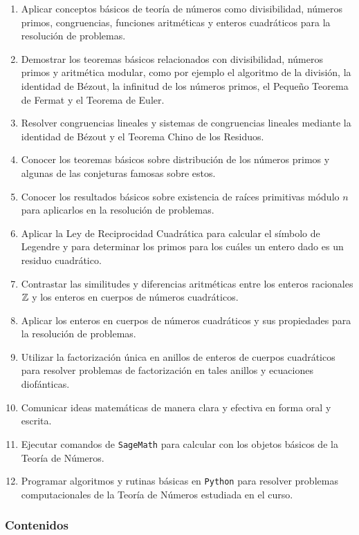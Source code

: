 \begin{refsection}
\begin{enumerate}
\item Aplicar conceptos básicos de teoría de números como divisibilidad, números primos, congruencias, funciones aritméticas y enteros cuadráticos para la resolución de problemas.
\item Demostrar los teoremas básicos relacionados con divisibilidad, números primos y aritmética modular, como por ejemplo el algoritmo de la división, la identidad de Bézout, la infinitud de los números primos, el Pequeño Teorema de Fermat y el Teorema de Euler.
\item Resolver congruencias lineales y sistemas de congruencias lineales mediante la identidad de Bézout y el Teorema Chino de los Residuos.
\item Conocer los teoremas básicos sobre distribución de los números primos y algunas de las conjeturas famosas sobre estos.
\item Conocer los resultados básicos sobre existencia de raíces primitivas módulo $n$ para aplicarlos en la resolución de problemas.
\item Aplicar la Ley de Reciprocidad Cuadrática para calcular el símbolo de Legendre y para determinar los primos para los cuáles un entero dado es un residuo cuadrático.
\item Contrastar las similitudes y diferencias aritméticas entre los enteros racionales $\mathbb{Z}$ y los enteros en cuerpos de números cuadráticos.
\item Aplicar los enteros en cuerpos de números cuadráticos y sus propiedades para la resolución de problemas.
\item Utilizar la factorización única en anillos de enteros de cuerpos cuadráticos para resolver problemas de factorización en tales anillos y ecuaciones diofánticas.
\item Comunicar ideas matemáticas de manera clara y efectiva en forma oral y escrita.
\item Ejecutar comandos de \texttt{SageMath} para calcular con los objetos básicos de la Teoría de Números.
\item Programar algoritmos y rutinas básicas en \texttt{Python} para resolver problemas computacionales de la Teoría de Números estudiada en el curso.
\end{enumerate}

\subsubsection*{Contenidos}


\end{refsection}
